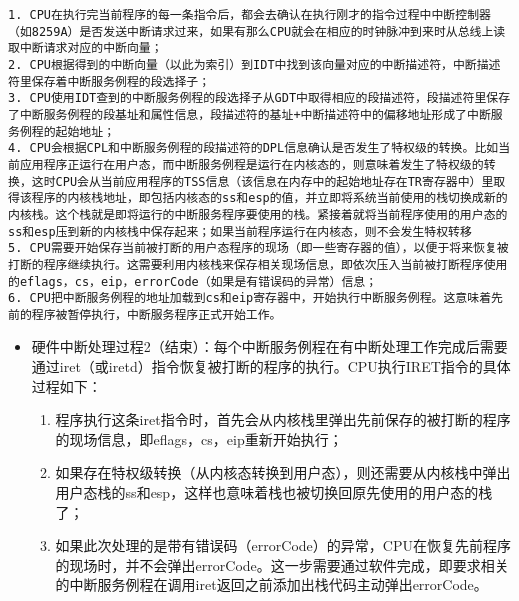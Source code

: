\begin{lstlisting}
1. CPU在执行完当前程序的每一条指令后，都会去确认在执行刚才的指令过程中中断控制器（如8259A）是否发送中断请求过来，如果有那么CPU就会在相应的时钟脉冲到来时从总线上读取中断请求对应的中断向量；
2. CPU根据得到的中断向量（以此为索引）到IDT中找到该向量对应的中断描述符，中断描述符里保存着中断服务例程的段选择子；
3. CPU使用IDT查到的中断服务例程的段选择子从GDT中取得相应的段描述符，段描述符里保存了中断服务例程的段基址和属性信息，段描述符的基址+中断描述符中的偏移地址形成了中断服务例程的起始地址；
4. CPU会根据CPL和中断服务例程的段描述符的DPL信息确认是否发生了特权级的转换。比如当前应用程序正运行在用户态，而中断服务例程是运行在内核态的，则意味着发生了特权级的转换，这时CPU会从当前应用程序的TSS信息（该信息在内存中的起始地址存在TR寄存器中）里取得该程序的内核栈地址，即包括内核态的ss和esp的值，并立即将系统当前使用的栈切换成新的内核栈。这个栈就是即将运行的中断服务程序要使用的栈。紧接着就将当前程序使用的用户态的ss和esp压到新的内核栈中保存起来；如果当前程序运行在内核态，则不会发生特权转移
5. CPU需要开始保存当前被打断的用户态程序的现场（即一些寄存器的值），以便于将来恢复被打断的程序继续执行。这需要利用内核栈来保存相关现场信息，即依次压入当前被打断程序使用的eflags，cs，eip，errorCode（如果是有错误码的异常）信息；
6. CPU把中断服务例程的地址加载到cs和eip寄存器中，开始执行中断服务例程。这意味着先前的程序被暂停执行，中断服务程序正式开始工作。
\end{lstlisting}

\begin{itemize}
\item
  硬件中断处理过程2（结束）：每个中断服务例程在有中断处理工作完成后需要通过iret（或iretd）指令恢复被打断的程序的执行。CPU执行IRET指令的具体过程如下：

  \begin{enumerate}
  \def\labelenumi{\arabic{enumi}.}
  \item
    程序执行这条iret指令时，首先会从内核栈里弹出先前保存的被打断的程序的现场信息，即eflags，cs，eip重新开始执行；
  \item
    如果存在特权级转换（从内核态转换到用户态），则还需要从内核栈中弹出用户态栈的ss和esp，这样也意味着栈也被切换回原先使用的用户态的栈了；
  \item
    如果此次处理的是带有错误码（errorCode）的异常，CPU在恢复先前程序的现场时，并不会弹出errorCode。这一步需要通过软件完成，即要求相关的中断服务例程在调用iret返回之前添加出栈代码主动弹出errorCode。
  \end{enumerate}
\end{itemize}

